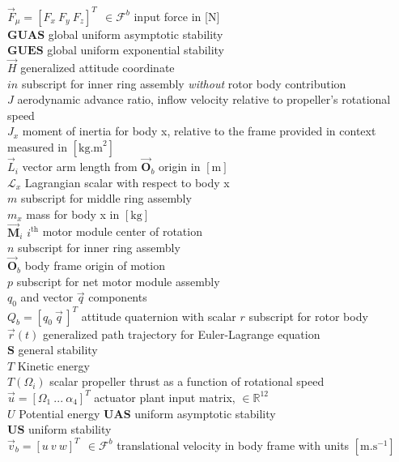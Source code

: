 \documentclass[a4paper, 11pt, oneside, openright, parskip=full]{book}
\begin{document}
$\vec{F}_\mu=[F_x~F_y~F_z]^T~~\in\mathcal{F}^b$ input force in [N]\\
$\mathbf{GUAS}$ global uniform asymptotic stability\\
$\mathbf{GUES}$ global uniform exponential stability\\
$\vec{H}$ generalized attitude coordinate\\
$in$ subscript for inner ring assembly \emph{without} rotor body contribution\\
$J$ aerodynamic advance ratio, inflow velocity relative to propeller's rotational speed\\
$J_x$ moment of inertia for body x, relative to the frame provided in context measured in $[\text{kg.m}^{2}]$\\
$\vec{L}_i$ vector arm length from $\vec{\mathbf{O}}_b$ origin in $[\text{m}]$\\
$\mathcal{L}_x$ Lagrangian scalar with respect to body x\\
$m$ subscript for middle ring assembly\\
$m_x$ mass for body x in $[\text{kg}]$\\
$\vec{\mathbf{M}}_i$ $i^\text{th}$ motor module center of rotation\\
$n$ subscript for inner ring assembly\\
$\vec{\mathbf{O}}_b$ body frame origin of motion\\
$p$ subscript for net motor module assembly\\
$q_0$ and vector $\vec{q}$ components\\
$Q_b=[q_0~\vec{q}\hspace{2pt}]^T$ attitude quaternion with scalar 
$r$ subscript for rotor body\\
$\vec{r}(t)$ generalized path trajectory for Euler-Lagrange equation\\
$\mathbf{S}$ general stability\\
$T$ Kinetic energy\\
$T(\Omega_i)$ scalar propeller thrust as a function of rotational speed\\
$\vec{u}=[\Omega_1~...~\alpha_4]^T$ actuator plant input matrix, $\in\mathbb{R}^{12}$\\
$U$ Potential energy
$\mathbf{UAS}$ uniform asymptotic stability\\
$\mathbf{US}$ uniform stability\\
$\vec{v}_b=[u~v~w]^T~~\in\mathcal{F}^b$ translational velocity in body frame with units $[\text{m.s}^{-1}]$\\
\end{document}
